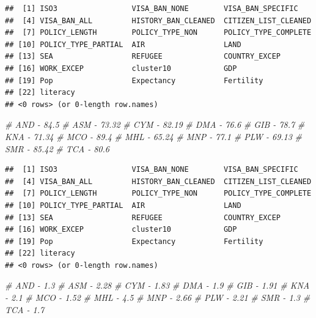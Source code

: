 \documentclass[]{article}
\newenvironment{Shaded}{\begin{snugshade}}{\end{snugshade}}
\newcommand{\CommentTok}[1]{\textcolor[rgb]{0.56,0.35,0.01}{\textit{#1}}}
\newcommand{\KeywordTok}[1]{\textcolor[rgb]{0.13,0.29,0.53}{\textbf{#1}}}
\newcommand{\NormalTok}[1]{#1}
\newcommand{\OperatorTok}[1]{\textcolor[rgb]{0.81,0.36,0.00}{\textbf{#1}}}
\begin{document}
\begin{verbatim}
##  [1] ISO3                 VISA_BAN_NONE        VISA_BAN_SPECIFIC   
##  [4] VISA_BAN_ALL         HISTORY_BAN_CLEANED  CITIZEN_LIST_CLEANED
##  [7] POLICY_LENGTH        POLICY_TYPE_NON      POLICY_TYPE_COMPLETE
## [10] POLICY_TYPE_PARTIAL  AIR                  LAND                
## [13] SEA                  REFUGEE              COUNTRY_EXCEP       
## [16] WORK_EXCEP           cluster10            GDP                 
## [19] Pop                  Expectancy           Fertility           
## [22] literacy            
## <0 rows> (or 0-length row.names)
\end{verbatim}

\begin{Shaded}
\begin{Highlighting}[]
\CommentTok{# AND - 84.5}
\CommentTok{# ASM - 73.32}
\CommentTok{# CYM - 82.19}
\CommentTok{# DMA - 76.6}
\CommentTok{# GIB - 78.7}
\CommentTok{# KNA - 71.34}
\CommentTok{# MCO - 89.4}
\CommentTok{# MHL - 65.24}
\CommentTok{# MNP - 77.1}
\CommentTok{# PLW - 69.13}
\CommentTok{# SMR - 85.42}
\CommentTok{# TCA - 80.6}
\end{Highlighting}
\end{Shaded}

\begin{Shaded}
\end{Shaded}

\begin{verbatim}
##  [1] ISO3                 VISA_BAN_NONE        VISA_BAN_SPECIFIC   
##  [4] VISA_BAN_ALL         HISTORY_BAN_CLEANED  CITIZEN_LIST_CLEANED
##  [7] POLICY_LENGTH        POLICY_TYPE_NON      POLICY_TYPE_COMPLETE
## [10] POLICY_TYPE_PARTIAL  AIR                  LAND                
## [13] SEA                  REFUGEE              COUNTRY_EXCEP       
## [16] WORK_EXCEP           cluster10            GDP                 
## [19] Pop                  Expectancy           Fertility           
## [22] literacy            
## <0 rows> (or 0-length row.names)
\end{verbatim}

\begin{Shaded}
\begin{Highlighting}[]
\CommentTok{# AND - 1.3}
\CommentTok{# ASM - 2.28}
\CommentTok{# CYM - 1.83}
\CommentTok{# DMA - 1.9}
\CommentTok{# GIB - 1.91}
\CommentTok{# KNA - 2.1}
\CommentTok{# MCO - 1.52}
\CommentTok{# MHL - 4.5}
\CommentTok{# MNP - 2.66}
\CommentTok{# PLW - 2.21}
\CommentTok{# SMR - 1.3}
\CommentTok{# TCA - 1.7}
\end{Highlighting}
\end{Shaded}
\end{document}
